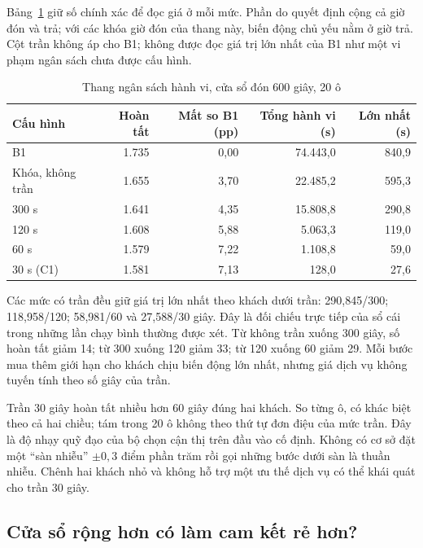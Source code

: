 Bảng~\ref{bang:thang1} giữ số chính xác để đọc giá ở mỗi mức. Phần do quyết định cộng
cả giờ đón và trả; với các khóa giờ đón của thang này, biến động chủ yếu nằm ở giờ trả.
Cột trần không áp cho B1; không được đọc giá trị lớn nhất của B1 như một vi phạm ngân
sách chưa được cấu hình.

\begin{table}[htbp]
\centering
\caption{Thang ngân sách hành vi, cửa sổ đón 600 giây, 20 ô}
\label{bang:thang1}
\small
\begin{tabular}{@{}lrrrr@{}}
\toprule
\textbf{Cấu hình} & \textbf{Hoàn tất} & \textbf{Mất so B1 (pp)} & \textbf{Tổng hành vi (s)} & \textbf{Lớn nhất (s)}\\
\midrule
B1 & 1.735 & 0,00 & 74.443,0 & 840,9\\
Khóa, không trần & 1.655 & 3,70 & 22.485,2 & 595,3\\
300 s & 1.641 & 4,35 & 15.808,8 & 290,8\\
120 s & 1.608 & 5,88 & 5.063,3 & 119,0\\
60 s & 1.579 & 7,22 & 1.108,8 & 59,0\\
30 s (C1) & 1.581 & 7,13 & 128,0 & 27,6\\
\bottomrule
\end{tabular}
\end{table}

Các mức có trần đều giữ giá trị lớn nhất theo khách dưới trần: 290,845/300;
118,958/120; 58,981/60 và 27,588/30 giây. Đây là đối chiếu trực tiếp của sổ cái trong
những lần chạy bình thường được xét. Từ không trần xuống 300 giây, số hoàn tất giảm
14; từ 300 xuống 120 giảm 33; từ 120 xuống 60 giảm 29. Mỗi bước mua thêm giới hạn cho
khách chịu biến động lớn nhất, nhưng giá dịch vụ không tuyến tính theo số giây của trần.

Trần 30 giây hoàn tất nhiều hơn 60 giây đúng hai khách. So từng ô, có khác biệt theo cả
hai chiều; tám trong 20 ô không theo thứ tự đơn điệu của mức trần. Đây là độ nhạy quỹ
đạo của bộ chọn cận thị trên đầu vào cố định. Không có cơ sở đặt một ``sàn nhiễu''
$\pm0{,}3$ điểm phần trăm rồi gọi những bước dưới sàn là thuần nhiễu. Chênh hai khách
nhỏ và không hỗ trợ một ưu thế dịch vụ có thể khái quát cho trần 30 giây.

\subsection{Cửa sổ rộng hơn có làm cam kết rẻ hơn?}



